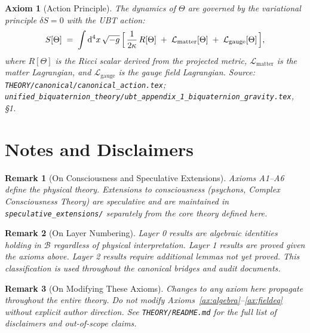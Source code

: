 \documentclass[11pt,a4paper]{article}
\newtheorem{axiom}{Axiom}
\newtheorem{remark}{Remark}
\begin{document}
\begin{axiom}[Action Principle]\label{ax:action}
The dynamics of $\Theta$ are governed by the variational principle
$\delta S = 0$ with the UBT action:
\begin{equation}
  S[\Theta] \;=\; \int \mathrm{d}^4x\,\sqrt{-g}\,
  \Bigl[\,
    \frac{1}{2\kappa}\,R[\Theta]
    \;+\;
    \mathcal{L}_{\mathrm{matter}}[\Theta]
    \;+\;
    \mathcal{L}_{\mathrm{gauge}}[\Theta]
  \,\Bigr],
\end{equation}
where $R[\Theta]$ is the Ricci scalar derived from the projected metric,
$\mathcal{L}_{\mathrm{matter}}$ is the matter Lagrangian, and
$\mathcal{L}_{\mathrm{gauge}}$ is the gauge field Lagrangian.
\emph{Source}: \texttt{THEORY/canonical/canonical\_action.tex};
\texttt{unified\_biquaternion\_theory/ubt\_appendix\_1\_biquaternion\_gravity.tex}, \S1.
\end{axiom}

\section{Notes and Disclaimers}

\begin{remark}[On Consciousness and Speculative Extensions]
Axioms A1--A6 define the physical theory. Extensions to consciousness
(psychons, Complex Consciousness Theory) are speculative and are
maintained in \texttt{speculative\_extensions/} separately from the
core theory defined here.
\end{remark}

\begin{remark}[On Layer Numbering]
Layer 0 results are algebraic identities holding in $\mathcal{B}$ regardless
of physical interpretation. Layer 1 results are proved given the axioms above.
Layer 2 results require additional lemmas not yet proved.
This classification is used throughout the canonical bridges and audit documents.
\end{remark}

\begin{remark}[On Modifying These Axioms]
Changes to any axiom here propagate throughout the entire theory.
Do not modify Axioms~\ref{ax:algebra}--\ref{ax:fieldeq} without explicit author direction.
See \texttt{THEORY/README.md} for the full list of disclaimers and out-of-scope claims.
\end{remark}
\end{document}
